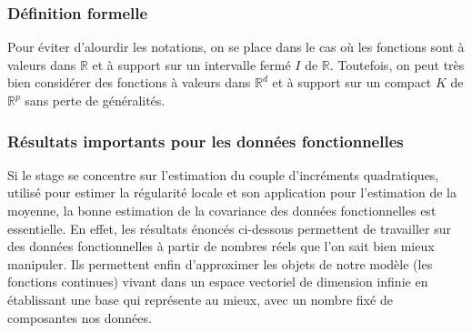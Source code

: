 \subsubsection{Définition formelle}

Pour éviter d'alourdir les notations, on se place dans le cas où les fonctions sont à valeurs dans $\mathds R$ et à support sur un intervalle fermé $I$ de $\mathds R$. Toutefois, on peut très bien considérer des fonctions à valeurs dans $\mathds R^d$ et à support sur un compact $K$ de $\mathds R^p$ sans perte de généralités.



\subsubsection{Résultats importants pour les données fonctionnelles}


Si le stage se concentre sur l'estimation du couple d'incréments quadratiques, utilisé pour estimer la régularité locale et son application pour l'estimation de la moyenne, la  bonne estimation de la covariance des données fonctionnelles est essentielle. En effet, les résultats énoncés ci-dessous permettent de travailler sur des données fonctionnelles à partir de nombres réels que l'on sait bien mieux manipuler. Ils permettent enfin d'approximer les objets de notre modèle (les fonctions continues) vivant dans un espace vectoriel de dimension infinie en établissant une base qui représente au mieux, avec un nombre fixé de composantes nos données.

\bigskip

